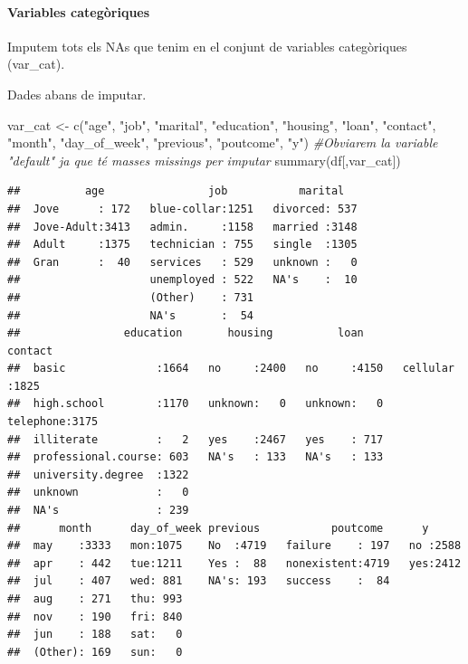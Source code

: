 \documentclass[
]{article}
\newenvironment{Shaded}{\begin{snugshade}}{\end{snugshade}}
\newcommand{\CommentTok}[1]{\textcolor[rgb]{0.56,0.35,0.01}{\textit{#1}}}
\newcommand{\FunctionTok}[1]{\textcolor[rgb]{0.00,0.00,0.00}{#1}}
\newcommand{\NormalTok}[1]{#1}
\newcommand{\OtherTok}[1]{\textcolor[rgb]{0.56,0.35,0.01}{#1}}
\newcommand{\StringTok}[1]{\textcolor[rgb]{0.31,0.60,0.02}{#1}}
\begin{document}
\hypertarget{variables-categuxf2riques}{%
\paragraph{Variables categòriques}\label{variables-categuxf2riques}}

Imputem tots els NAs que tenim en el conjunt de variables categòriques
(var\_cat).

Dades abans de imputar.

\begin{Shaded}
\begin{Highlighting}[]
\NormalTok{var\_cat }\OtherTok{\textless{}{-}} \FunctionTok{c}\NormalTok{(}\StringTok{"age"}\NormalTok{, }\StringTok{"job"}\NormalTok{, }\StringTok{"marital"}\NormalTok{, }\StringTok{"education"}\NormalTok{, }\StringTok{"housing"}\NormalTok{, }\StringTok{"loan"}\NormalTok{, }\StringTok{"contact"}\NormalTok{, }\StringTok{"month"}\NormalTok{, }\StringTok{"day\_of\_week"}\NormalTok{, }\StringTok{"previous"}\NormalTok{, }\StringTok{"poutcome"}\NormalTok{, }\StringTok{"y"}\NormalTok{) }\CommentTok{\#Obviarem la variable "default" ja que té masses missings per imputar}
\FunctionTok{summary}\NormalTok{(df[,var\_cat])}
\end{Highlighting}
\end{Shaded}

\begin{verbatim}
##          age                job           marital    
##  Jove      : 172   blue-collar:1251   divorced: 537  
##  Jove-Adult:3413   admin.     :1158   married :3148  
##  Adult     :1375   technician : 755   single  :1305  
##  Gran      :  40   services   : 529   unknown :   0  
##                    unemployed : 522   NA's    :  10  
##                    (Other)    : 731                  
##                    NA's       :  54                  
##                education       housing          loan           contact    
##  basic              :1664   no     :2400   no     :4150   cellular :1825  
##  high.school        :1170   unknown:   0   unknown:   0   telephone:3175  
##  illiterate         :   2   yes    :2467   yes    : 717                   
##  professional.course: 603   NA's   : 133   NA's   : 133                   
##  university.degree  :1322                                                 
##  unknown            :   0                                                 
##  NA's               : 239                                                 
##      month      day_of_week previous           poutcome      y       
##  may    :3333   mon:1075    No  :4719   failure    : 197   no :2588  
##  apr    : 442   tue:1211    Yes :  88   nonexistent:4719   yes:2412  
##  jul    : 407   wed: 881    NA's: 193   success    :  84             
##  aug    : 271   thu: 993                                             
##  nov    : 190   fri: 840                                             
##  jun    : 188   sat:   0                                             
##  (Other): 169   sun:   0
\end{verbatim}
\end{document}
